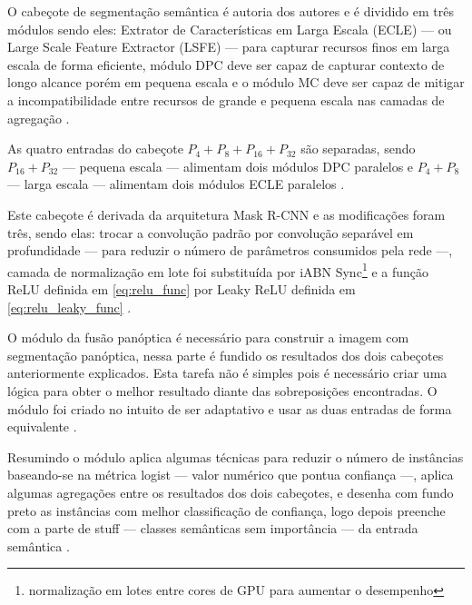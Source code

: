 
O cabeçote de segmentação semântica é autoria dos autores e é dividido em três módulos sendo eles: Extrator de Características em Larga Escala (ECLE) — ou Large Scale Feature Extractor (LSFE) — para capturar recursos finos em larga escala de forma eficiente, módulo DPC deve ser capaz de capturar contexto de longo alcance porém em pequena escala e o módulo MC deve ser capaz de mitigar a incompatibilidade entre recursos de grande e pequena escala nas camadas de agregação \space\cite{mohan2020efficientps}.

As quatro entradas do cabeçote $ P_4 + P_8 + P_{16} + P_{32} $ são separadas, sendo $ P_{16} + P_{32} $ — pequena escala — alimentam dois módulos DPC paralelos e $ P_4 + P_8 $ — larga escala — alimentam dois módulos ECLE paralelos \space\cite{mohan2020efficientps}.


Este cabeçote é derivada da arquitetura Mask R-CNN e as modificações foram três, sendo elas: trocar a convolução padrão por convolução separável em profundidade — para reduzir o número de parâmetros consumidos pela rede —, camada de normalização em lote foi substituída por iABN Sync\footnote{normalização em lotes entre cores de GPU para aumentar o desempenho} e a função ReLU definida em \cref{eq:relu_func} por Leaky ReLU definida em \cref{eq:relu_leaky_func} \space\cite{mohan2020efficientps,redes-neurais-convolucionais-separaveis-em-profundidade, serp-ai}.


O módulo da fusão panóptica é necessário para construir a imagem com segmentação panóptica, nessa parte é fundido os resultados dos dois cabeçotes anteriormente explicados. Esta tarefa não é simples pois é necessário criar uma lógica para obter o melhor resultado diante das sobreposições encontradas. O módulo foi criado no intuito de ser adaptativo e usar as duas entradas de forma equivalente \space\cite{mohan2020efficientps}.

Resumindo o módulo aplica algumas técnicas para reduzir o número de instâncias baseando-se na métrica logist — valor numérico que pontua confiança —, aplica algumas agregações entre os resultados dos dois cabeçotes, e desenha com fundo preto as instâncias com melhor classificação de confiança, logo depois preenche com a parte de stuff — classes semânticas sem importância — da entrada semântica \space\cite{mohan2020efficientps}.